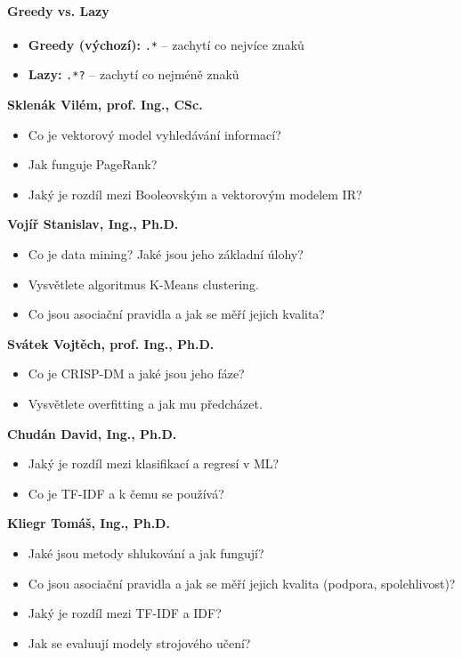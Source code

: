 \paragraph{Greedy vs. Lazy}
\begin{itemize}
  \item \textbf{Greedy (výchozí):} \texttt{.*} -- zachytí co nejvíce znaků
  \item \textbf{Lazy:} \texttt{.*?} -- zachytí co nejméně znaků
\end{itemize}

\begin{profesorbox}
\textbf{Sklenák Vilém, prof. Ing., CSc.}
\begin{itemize}
  \item Co je vektorový model vyhledávání informací?
  \item Jak funguje PageRank?
  \item Jaký je rozdíl mezi Booleovským a vektorovým modelem IR?
\end{itemize}
\textbf{Vojíř Stanislav, Ing., Ph.D.}
\begin{itemize}
  \item Co je data mining? Jaké jsou jeho základní úlohy?
  \item Vysvětlete algoritmus K-Means clustering.
  \item Co jsou asociační pravidla a jak se měří jejich kvalita?
\end{itemize}
\textbf{Svátek Vojtěch, prof. Ing., Ph.D.}
\begin{itemize}
  \item Co je CRISP-DM a jaké jsou jeho fáze?
  \item Vysvětlete overfitting a jak mu předcházet.
\end{itemize}
\textbf{Chudán David, Ing., Ph.D.}
\begin{itemize}
  \item Jaký je rozdíl mezi klasifikací a regresí v ML?
  \item Co je TF-IDF a k čemu se používá?
\end{itemize}
\textbf{Kliegr Tomáš, Ing., Ph.D.}
\begin{itemize}
  \item Jaké jsou metody shlukování a jak fungují?
  \item Co jsou asociační pravidla a jak se měří jejich kvalita (podpora, spolehlivost)?
  \item Jaký je rozdíl mezi TF-IDF a IDF?
  \item Jak se evaluují modely strojového učení?

\end{itemize}
\end{profesorbox}
